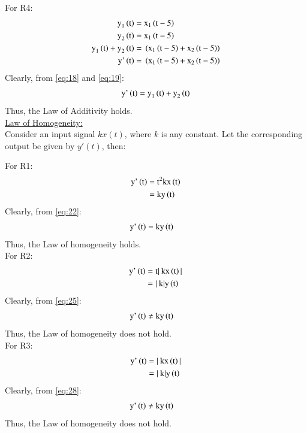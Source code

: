 \documentclass[journal,12pt,twocolumn]{IEEEtran}
\begin{document}
For R4:
\begin{align}
\label{eq:16}
    \text{y}_1\left(\text{t}\right) ={}& \text{x}_{1}\left(\text{t}-5\right)\\
    \label{eq:17}
    \text{y}_2\left(\text{t}\right)  ={}& \text{x}_{1}\left(\text{t}-5\right)\\
    \label{eq:18}
   \text{y}_1\left(\text{t}\right) +\text{y}_2\left(\text{t}\right)  ={}& \left(\text{x}_{1}\left(\text{t}-5\right)+\text{x}_{2}\left(\text{t}-5\right)\right)\\
   \label{eq:19}
 \text{y'}\left(\text{t}\right) ={}& \left(\text{x}_{1}\left(\text{t}-5\right)+\text{x}_{2}\left(\text{t}-5\right)\right)
\end{align}
Clearly, from \eqref{eq:18} and \eqref{eq:19}:
\begin{align}
\label{eq:20}
    \text{y'}\left(\text{t}\right) = \text{y}_1\left(\text{t}\right) +\text{y}_2\left(\text{t}\right) 
\end{align}
Thus, the Law of Additivity holds.\\



\underline{Law of Homogeneity: }\\
Consider an input signal $kx(t)$, where $k$ is any constant. Let the corresponding output be given by $y'(t)$, then:

For R1:
\begin{align}
\label{eq:21}
 \text{y'}\left(\text{t}\right) ={}& \text{t}^2\text{k}\text{x}\left(\text{t}\right)\\
 \label{eq:22}
   ={}& \text{k}\text{y}\left(\text{t}\right)
\end{align}
Clearly, from \eqref{eq:22}:
\begin{align}
\label{eq:23}
    \text{y'}\left(\text{t}\right) ={}& \text{k}\text{y}\left(\text{t}\right)
\end{align}
Thus, the Law of homogeneity holds.\\

For R2:
\begin{align}
\label{eq:24}
 \text{y'}\left(\text{t}\right) ={}& \text{t}|\:\text{k}\text{x}\left(\text{t}\right)|\\
 \label{eq:25}
   ={}& |\:\text{k}|\text{y}\left(\text{t}\right)
\end{align}
Clearly, from \eqref{eq:25}:
\begin{align}
\label{eq:26}
    \text{y'}\left(\text{t}\right) \neq{}& \text{k}\text{y}\left(\text{t}\right)
\end{align}
Thus, the Law of homogeneity does not hold.\\

For R3:
\begin{align}
\label{eq:27}
 \text{y'}\left(\text{t}\right) ={}& |\:\text{k}\text{x}\left(\text{t}\right)|\\
 \label{eq:28}
   ={}& |\:\text{k}|\text{y}\left(\text{t}\right)
\end{align}
Clearly, from \eqref{eq:28}:
\begin{align}
\label{eq:29}
    \text{y'}\left(\text{t}\right) \neq{}& \text{k}\text{y}\left(\text{t}\right)
\end{align}
Thus, the Law of homogeneity does not hold.\\
\end{document}
